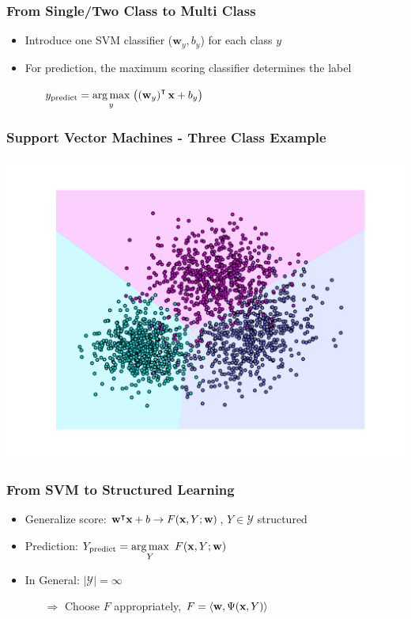 \begin{frame}
    \frametitle{From Single/Two Class to Multi Class}
    \begin{itemize}
          \item Introduce one SVM classifier ($\textbf{w}_y, b_y$) for each class $y$
          \item For prediction, the maximum scoring classifier determines the label
        \begin{itemize}
              \item[] $\displaystyle y_{\text{predict}} = \operatorname*{arg\,max}_y \;
            \bigl(\left(\textbf{w}_y\right)^{\intercal}\textbf{x} + b_y\bigr) $
        \end{itemize}
    \end{itemize}
\end{frame}


\begin{frame}
    \frametitle{Support Vector Machines - Three Class Example}
    \includegraphics[width=\textwidth]{images/three_class_svm.pdf}
\end{frame}

\begin{frame}
    \frametitle{From SVM to Structured Learning}
    \begin{itemize}
          \item Generalize score: $\textbf{w}^{\intercal}\textbf{x} + b \rightarrow F(\textbf{x}, Y; \textbf{w})$, $Y \in
        \mathcal{Y}$ structured
          \item Prediction: $\displaystyle Y_{\text{predict}} = \operatorname*{arg\,max}_Y\ F(\textbf{x}, Y; \textbf{w}) $%
          \item In General: $|\mathcal{Y}| = \infty$
        \begin{itemize}
              \item[$\Rightarrow$] Choose $F$ appropriately, \eg $F=\langle \textbf{w}, \Psi(\textbf{x},Y) \rangle$
        \end{itemize}
          \item[] \cf {}
    \end{itemize}
\end{frame}


